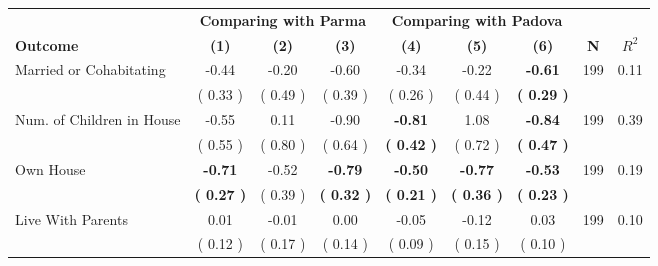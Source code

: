 \begin{tabular}{lcccccccc}
\toprule
 & \multicolumn{3}{c}{\textbf{Comparing with Parma}} & \multicolumn{3}{c}{\textbf{Comparing with Padova}} & \\
\cmidrule(lr){2-4} \cmidrule(lr){5-7} 
 \textbf{Outcome} & \textbf{(1)} & \textbf{(2)} & \textbf{(3)} & \textbf{(4)} & \textbf{(5)} & \textbf{(6)} & \textbf{N} & \textbf{$ R^2$} \\
\midrule
Married or Cohabitating &     -0.44 &     -0.20 &     -0.60 &     -0.34 &     -0.22 & \textbf{    -0.61} & 199 &       0.11 \\ 
 & (     0.33 ) & (     0.49 ) & (     0.39 ) & (     0.26 ) & (     0.44 ) & \textbf{(     0.29 )} & \\
Num. of Children in House &     -0.55 &      0.11 &     -0.90 & \textbf{    -0.81} &      1.08 & \textbf{    -0.84} & 199 &       0.39 \\ 
 & (     0.55 ) & (     0.80 ) & (     0.64 ) & \textbf{(     0.42 )} & (     0.72 ) & \textbf{(     0.47 )} & \\
Own House & \textbf{    -0.71} &     -0.52 & \textbf{    -0.79} & \textbf{    -0.50} & \textbf{    -0.77} & \textbf{    -0.53} & 199 &       0.19 \\ 
 & \textbf{(     0.27 )} & (     0.39 ) & \textbf{(     0.32 )} & \textbf{(     0.21 )} & \textbf{(     0.36 )} & \textbf{(     0.23 )} & \\
Live With Parents &      0.01 &     -0.01 &      0.00 &     -0.05 &     -0.12 &      0.03 & 199 &       0.10 \\ 
 & (     0.12 ) & (     0.17 ) & (     0.14 ) & (     0.09 ) & (     0.15 ) & (     0.10 ) & \\
\bottomrule
\end{tabular}

